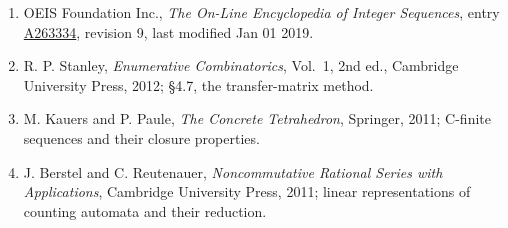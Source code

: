 \documentclass[11pt]{article}
\theoremstyle{definition}
\begin{document}
\begin{enumerate}

\item OEIS Foundation Inc., \emph{The On-Line Encyclopedia of Integer Sequences}, entry \href{https://oeis.org/A263334}{A263334}, revision 9, last modified Jan 01 2019.

\item R. P. Stanley, \emph{Enumerative Combinatorics}, Vol.~1, 2nd ed., Cambridge University Press, 2012; \S4.7, the transfer-matrix method.

\item M. Kauers and P. Paule, \emph{The Concrete Tetrahedron}, Springer, 2011; C-finite sequences and their closure properties.

\item J. Berstel and C. Reutenauer, \emph{Noncommutative Rational Series with Applications}, Cambridge University Press, 2011; linear representations of counting automata and their reduction.

\end{enumerate}
\end{document}

